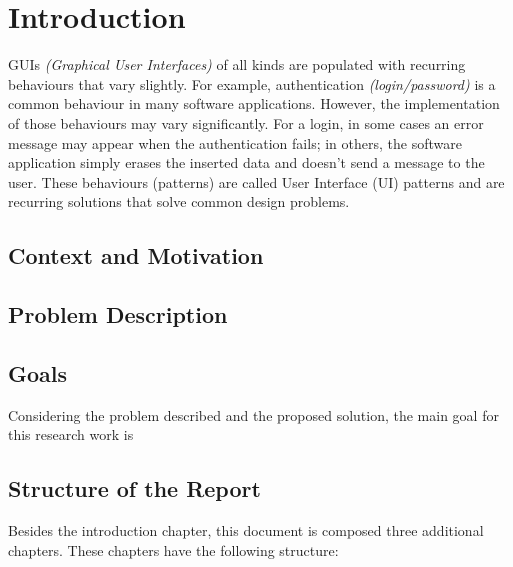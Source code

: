 \chapter{Introduction} \label{chap:intro}

GUIs \textit{(Graphical User Interfaces)} of all kinds are populated with recurring behaviours that vary slightly. For example, authentication \textit{(login/password)} is a common behaviour in many software applications. However, the implementation of those behaviours may vary significantly. For a login, in some cases an error message may appear when the authentication fails; in others, the software application simply erases the inserted data and doesn't send a message to the user. These behaviours (patterns) are called User Interface (UI) patterns \cite{van2001patterns} and are recurring solutions that solve common design problems. 



\section{Context and Motivation} \label{sec:context}


\section{Problem Description} \label{sec:problemdescription}


\section{Goals} \label{sec:goals}
Considering the problem described and the proposed solution, the main goal for this research work is

%
%
%
%
%

\section{Structure of the Report} \label{sec:outline}

Besides the introduction chapter, this document is composed three additional chapters. These chapters have the following structure:

